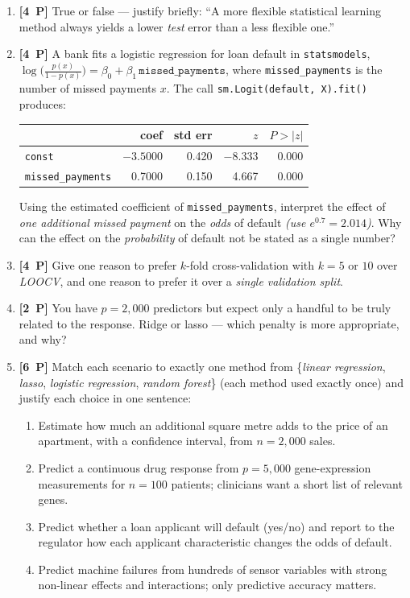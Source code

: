 \documentclass[11pt,a4paper]{article}
\newcommand{\pp}[1]{\textbf{[#1~P]}\enspace}
\begin{document}
\begin{enumerate}[label=(\alph*),leftmargin=7mm,itemsep=2.5mm]
  \item \pp{4} True or false --- justify briefly: ``A more flexible statistical learning method
    always yields a lower \emph{test} error than a less flexible one.''
  \item \pp{4} A bank fits a logistic regression for loan default in \texttt{statsmodels},
    $\log\bigl(\frac{p(x)}{1-p(x)}\bigr)=\beta_0+\beta_1\,\texttt{missed\_payments}$, where
    \texttt{missed\_payments} is the number of missed payments $x$. The call
    \texttt{sm.Logit(default, X).fit()} produces:
    \begin{center}
    \begin{tabular}{lrrrr}
    \toprule
     & coef & std err & $z$ & $P>|z|$\\
    \midrule
    \texttt{const}            & $-3.5000$ & 0.420 & $-8.333$ & 0.000\\
    \texttt{missed\_payments} &   0.7000  & 0.150 &   4.667  & 0.000\\
    \bottomrule
    \end{tabular}
    \end{center}
    Using the estimated coefficient of \texttt{missed\_payments}, interpret the effect of
    \emph{one additional missed payment} on the \emph{odds} of default
    \emph{(use $e^{0.7}=2.014$)}. Why can the effect on the \emph{probability} of default not be
    stated as a single number?
  \item \pp{4} Give one reason to prefer $k$-fold cross-validation with $k=5$ or $10$ over
    \emph{LOOCV}, and one reason to prefer it over a \emph{single validation split}.
  \item \pp{2} You have $p=2{,}000$ predictors but expect only a handful to be truly related to
    the response. Ridge or lasso --- which penalty is more appropriate, and why?
  \item \pp{6} Match each scenario to exactly one method from
    \{\emph{linear regression}, \emph{lasso}, \emph{logistic regression},
    \emph{random forest}\} (each method used exactly once) and justify each choice in one
    sentence:
    \begin{enumerate}[label=(\roman*),nosep,topsep=1mm]
      \item Estimate how much an additional square metre adds to the price of an apartment,
        with a confidence interval, from $n=2{,}000$ sales.
      \item Predict a continuous drug response from $p=5{,}000$ gene-expression measurements
        for $n=100$ patients; clinicians want a short list of relevant genes.
      \item Predict whether a loan applicant will default (yes/no) and report to the regulator
        how each applicant characteristic changes the odds of default.
      \item Predict machine failures from hundreds of sensor variables with strong non-linear
        effects and interactions; only predictive accuracy matters.
    \end{enumerate}
\end{enumerate}
\end{document}
